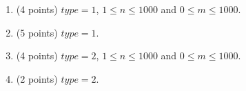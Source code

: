 \begin{enumerate}
    \tightlist
    \item (4 points) $type = 1$, $1 \leq n \leq 1000$ and $0 \leq m \leq 1000$.
    \item (5 points) $type = 1$.
    \item (4 points) $type = 2$, $1 \leq n \leq 1000$ and $0 \leq m \leq 1000$.
    \item (2 points) $type = 2$.
\end{enumerate}
    